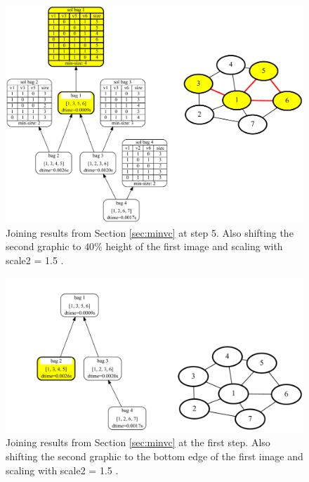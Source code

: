 \documentclass[a4paper, 12pt, bibliography=totoc]{scrartcl}
\begin{document}
\begin{figure}[H]
	\centering
	\includegraphics[width=0.9\linewidth,height=0.9\textheight,keepaspectratio]{images/SVGJOIN/default_06sc155.pdf}
	\caption[Joining results from Section \ref{sec:minvc} at step 5]{Joining results from Section \ref{sec:minvc} at step 5. Also shifting the second graphic to $40\%$ height of the first image and scaling with scale2 = 1.5 .}
	\label{fig:joinscaled5}
\end{figure}
\begin{figure}[H]
	\centering
	\includegraphics[width=0.9\linewidth,height=0.9\textheight,keepaspectratio]{images/SVGJOIN/default_06sc15_rise1.pdf}
	\caption[Comprehensive example joining results together step 1/5]{Joining results from Section \ref{sec:minvc} at the first step. Also shifting the second graphic to the bottom edge of the first image and scaling with scale2 = 1.5 .}
	\label{fig:joinscaledrise1}
\end{figure}
\end{document}
